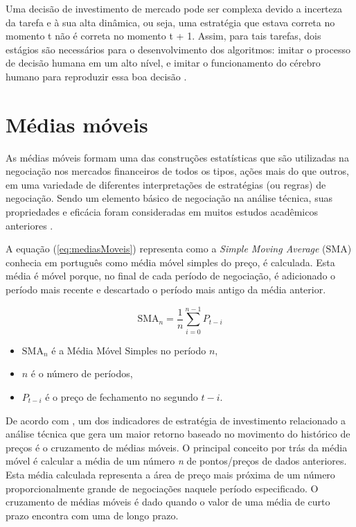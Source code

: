 \documentclass{iftex2024}
\begin{document}
Uma decisão de investimento de mercado pode ser complexa devido a incerteza da tarefa e à sua alta dinâmica, 
ou seja, uma estratégia que estava correta no momento t não é correta no momento t + 1. 
Assim, para tais tarefas, dois estágios são necessários para o desenvolvimento dos algoritmos: imitar o processo
de decisão humana em um alto nível, e imitar o funcionamento do cérebro humano para
reproduzir essa boa decisão \cite{WILINSKI2017100}.

\section{Médias móveis}

As médias móveis formam uma das construções estatísticas que são
utilizadas na negociação nos mercados financeiros de todos os tipos, ações mais
do que outros, em uma variedade de diferentes interpretações de estratégias (ou regras) de
negociação. Sendo um elemento básico de negociação na análise técnica, suas propriedades e eficácia foram consideradas 
em muitos estudos acadêmicos anteriores \cite{PAPAILIAS2015458}.

A equação (\ref{eq:mediasMoveis}) representa como a \textit{Simple Moving Average} (SMA) conhecia em português como média móvel simples do preço, é calculada. 
Esta média é móvel porque, no final de cada período de negociação, 
é adicionado o período mais recente e descartado o período mais antigo da média anterior.

\begin{equation}
  \label{eq:mediasMoveis} 
  \text{SMA}_n = \frac{1}{n} \sum_{i=0}^{n-1} P_{t-i}   
\end{equation}

\begin{itemize}
  \item $\text{SMA}_n$ é a Média Móvel Simples no período $n$,
  \item $n$ é o número de períodos,
  \item $P_{t-i}$ é o preço de fechamento no segundo $t-i$.
\end{itemize}

De acordo com \textcite{el2009decision}, um dos indicadores de estratégia de investimento relacionado a análise 
técnica que gera um maior retorno baseado no movimento do histórico de preços é o cruzamento de médias móveis. 
O principal conceito por trás da média móvel é calcular a média de um número \textit{n} de pontos/preços de dados anteriores. 
Esta média calculada representa a área de preço mais próxima de um número proporcionalmente grande de negociações naquele 
período especificado. O cruzamento de médias móveis é dado quando o valor de uma média de curto prazo encontra 
com uma de longo prazo.
\end{document}
